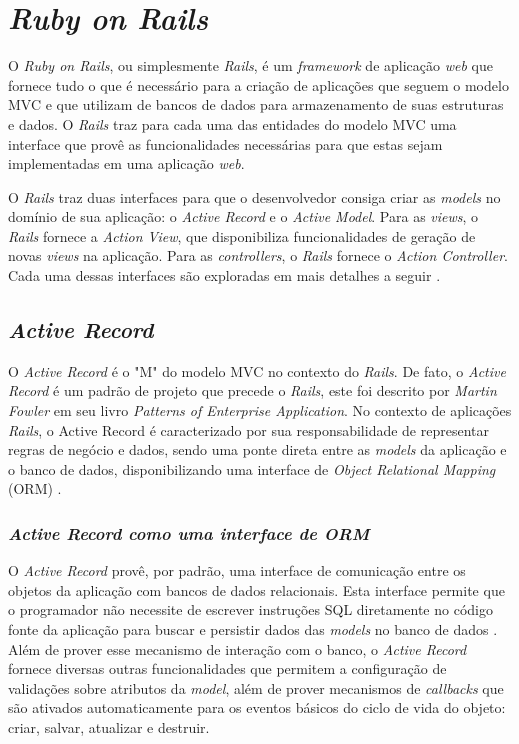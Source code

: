 \section{\textit{Ruby on Rails}}

O \textit{Ruby on Rails}, ou simplesmente \textit{Rails}, é um \textit{framework} de aplicação \textit{web} que fornece tudo o que é necessário para a criação de aplicações que seguem o modelo MVC e que utilizam de bancos de dados para armazenamento de suas estruturas e dados. O \textit{Rails} traz para cada uma das entidades do modelo MVC uma interface que provê as funcionalidades necessárias para que estas sejam implementadas em uma aplicação \textit{web}.

O \textit{Rails} traz duas interfaces para que o desenvolvedor consiga criar as \textit{models} no domínio de sua aplicação: o \textit{Active Record} e o \textit{Active Model}. Para as \textit{views}, o \textit{Rails} fornece a \textit{Action View}, que disponibiliza funcionalidades de geração de novas \textit{views} na aplicação. Para as \textit{controllers}, o \textit{Rails} fornece o \textit{Action Controller}. Cada uma dessas interfaces são exploradas em mais detalhes a seguir \cite{railsapi2023}.

\subsection{\textit{Active Record}}

O \textit{Active Record} é o "M" do modelo MVC no contexto do \textit{Rails}. De fato, o \textit{Active Record} é um padrão de projeto que precede o \textit{Rails}, este foi descrito por \textit{Martin Fowler} em seu livro \textit{Patterns of Enterprise Application}. No contexto de aplicações \textit{Rails}, o Active Record é caracterizado por sua responsabilidade de representar regras de negócio e dados, sendo uma ponte direta entre as \textit{models} da aplicação e o banco de dados, disponibilizando uma interface de \textit{Object Relational Mapping} (ORM) \cite{activerecord-basics}.

\subsubsection{\textit{Active Record como uma interface de ORM}}

O \textit{Active Record} provê, por padrão, uma interface de comunicação entre os objetos da aplicação com bancos de dados relacionais. Esta interface permite que o programador não necessite de escrever instruções SQL diretamente no código fonte da aplicação para buscar e persistir dados das \textit{models} no banco de dados \cite{activerecord-basics}. Além de prover esse mecanismo de interação com o banco, o \textit{Active Record} fornece diversas outras funcionalidades que permitem a configuração de validações sobre atributos da \textit{model}, além de prover mecanismos de \textit{callbacks} que são ativados automaticamente para os eventos básicos do ciclo de vida do objeto: criar, salvar, atualizar e destruir.

